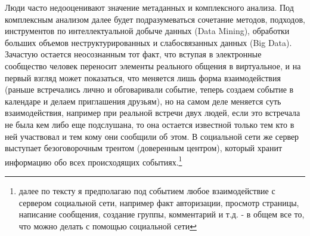 Люди часто недооценивают значение метаданных и комплексного анализа. 
Под комплексным анализом далее будет подразумеваться сочетание методов, подходов, инструментов по интеллектуальной добыче данных (Data Mining), %
обработки больших объемов неструктурированных и слабосвязанных данных (Big Data).\\
Зачастую остается неосознанным тот факт, что вступая в электронные сообщество человек переносит элементы реального общения в виртуальное, и на первый взгляд может показаться, что меняется лишь форма взаимодействия (раньше встречались лично и обговаривали событие, теперь создаем событие в календаре и делаем приглашения друзьям), но на самом деле меняется суть взаимодействия, например при реальной встречи двух людей, если это встречала не была кем либо еще подслушана, то она остается известной только тем кто в ней участвовал и тем кому они сообщили об этом. В социальной сети же сервер выступает безоговорочным трентом (доверенным центром), который хранит информацию обо всех происходящих событиях.\footnote{далее по тексту я предполагаю под событием любое взаимодействие с сервером социальной сети, например факт авторизации, просмотр страницы, написание сообщения, создание группы, комментарий и т.д. - в общем все то, что можно делать с помощью социальной сети}
